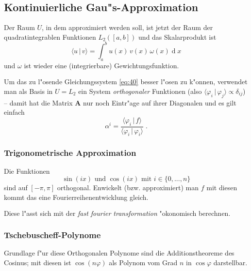 \documentclass[a4paper]{book}
\newcommand{\diff}{\ensuremath{\operatorname d}}
\newcommand{\Mat}[1]{\ensuremath{\mathbf{#1}}}
\begin{document}
\subsection{Kontinuierliche Gau"s-Approximation}
\label{sec:kontinuierliche_gaus_approximation}

Der Raum $U$, in dem approximiert werden soll, ist jetzt der Raum der
quadratintegrablen Funktionen $L_2([a,b])$ und das Skalarprodukt ist 
\begin{equation}
  \label{eq:42}
  \langle u \,|\,v  \rangle = \int_{a}^b u(x)\,v(x)\,\omega(x)\diff x 
\end{equation}
und $\omega$ ist wieder eine (integrierbare) Gewichtungsfunktion.

Um das zu l"osende Gleichungssystem \eqref{eq:40} besser l"osen zu
k"onnen, verwendet man als Basis in $U=L_2$ ein System
\emph{orthogonaler} Funktionen (also $\langle \varphi_i \,|\,\varphi_j
\rangle \propto \delta_{ij}$) -- damit hat die Matrix $\Mat A$ nur
noch Eintr"age auf ihrer Diagonalen und es gilt einfach
\begin{equation}
  \label{eq:43}
  \alpha^i = \frac{\langle \varphi_i \,|\, f \rangle}{\langle
    \varphi_i \,|\,\varphi_i  \rangle} \;.
\end{equation}




\subsubsection{Trigonometrische Approximation}
\label{sec:trigonometrische_approximation}

Die Funktionen
\begin{equation}
  \label{eq:44}
  \sin(i x) \text{ und } \cos(ix) \text{ mit } i \in \{0, ..., n\}
\end{equation}
sind auf $[-\pi,\pi]$ orthogonal. Enwickelt (bzw. approximiert) man $f$
mit diesen kommt das eine Fourierreihenentwicklung gleich.

Diese l"asst sich mit der \emph{fast fourier transformation}
"okonomisch berechnen.




\subsubsection{Tschebuscheff-Polynome}
\label{sec:tschebuscheff_polynome}

Grundlage f"ur diese Orthogonalen Polynome sind die Additionstheoreme
des Cosinus; mit diesen ist $\cos( n \varphi)$ als Polynom vom Grad $n$
in $\cos \varphi$ darstellbar.
\end{document}
